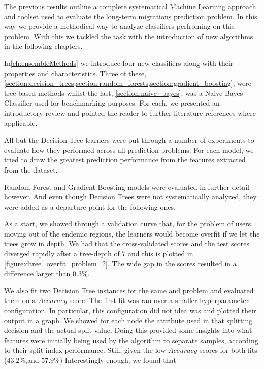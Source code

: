 The previous results outline a complete systematical Machine Learning approach and toolset used to evaluate the long-term migrations prediction problem.
In this way we provide a methodical way to analyze classifiers perfroming on this problem.
With this we tackled the task with the introduction of new algorithms in the following chapters.



In\cref{ch:ensembleMethods} we introduce four new classifiers along with their properties and characteristics. Three of these, \cref{section:decision_trees,section:random_forests,section:gradient_boosting}, were tree based methods whilst the last, \cref{section:naive_bayes}, was a Naive Bayes Classifier used for benchmarking purposes.
For each, we presented an introductory review and pointed the reader to further literature references where applicable.

All but the Decision Tree learners were put through a number of experiments to evaluate how they performed across all prediction problems.
For each model, we tried to draw the greatest prediction performance from the features extracted from the dataset.

Random Forest and Gradient Boosting models were evaluated in further detail however.
And even though Decision Trees were not systematically analyzed, they were added as a departure point for the following ones.

As a start, we showed through a validation curve that, for the problem of users moving out of the endemic regions, the learners would become overfit if we let the trees grow in depth.
We had that the cross-validated scores and the test scores diverged rapidly after a tree-depth of $7$ and this is plotted in \cref{figure:dtree_overfit_problem_2}.
The wide gap in the scores resulted in a difference larger than $0.3\%$.

We also fit two Decision Tree instances for the same and problem and evaluated them on a $Accuracy$ score.
The first fit was ran over a smaller hyperparameter configuration.
In particular, this configuration did not
idea was
 and plotted their output in a graph.
We showed for each node the attribute used in that splitting decision and the actual split value.
Doing this provided some insights into what features were initially being used by the algorithm to separate samples, according to their split index performance.
Still, given the low $Accuracy$ scores for both fits ($43.2\%$,and $57.9\%$)
Interestingly enough, we found that

